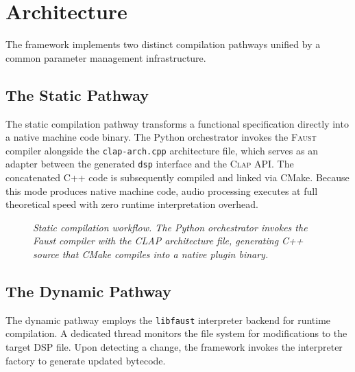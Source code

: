\documentclass[twoside,a4paper]{article}
\newcommand{\F}{\textsc{Faust}}
\newcommand{\CLAP}{\textsc{Clap}}
\begin{document}
\section{Architecture}
\label{sec:architecture}

The framework implements two distinct compilation pathways unified by a common parameter management infrastructure.

\subsection{The Static Pathway}

The static compilation pathway transforms a functional specification directly into a native machine code binary. The Python orchestrator invokes the \F{} compiler alongside the \texttt{clap-arch.cpp} architecture file, which serves as an adapter between the generated \texttt{dsp} interface and the \CLAP{} API. The concatenated C++ code is subsequently compiled and linked via CMake. Because this mode produces native machine code, audio processing executes at full theoretical speed with zero runtime interpretation overhead.

\begin{figure}[ht]
\centering
{}
\caption{\label{fig:static_workflow}{\it Static compilation workflow. The Python orchestrator invokes the Faust compiler with the CLAP architecture file, generating C++ source that CMake compiles into a native plugin binary.}}
\end{figure}

\subsection{The Dynamic Pathway}

The dynamic pathway employs the \texttt{libfaust} interpreter backend for runtime compilation. A dedicated thread monitors the file system for modifications to the target DSP file. Upon detecting a change, the framework invokes the interpreter factory to generate updated bytecode. 
\end{document}
